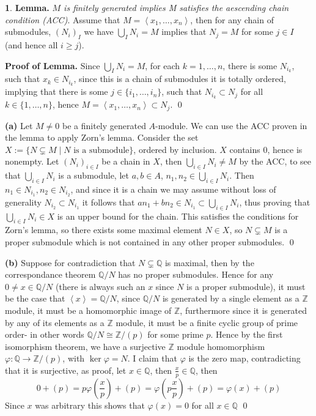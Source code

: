 \documentclass[11pt]{article}
\theoremstyle{definition}
\newtheorem{pb}{}
\newcommand{\set}[1]{\{#1\}}
\newcommand{\gen}[1]{\left\langle #1 \right\rangle}
\begin{document}
    \begin{pb}
        \textbf{Lemma.} \emph{\(M\) is finitely generated implies M satisfies the aescending chain condition (ACC)}. Assume that \(M = \gen{x_1,\hdots,x_n}\), then for any chain of submodules, \((N_i)_I\) we have \(\bigcup_I N_i = M\) implies that \(N_j = M\) for some \(j \in I\) (and hence all \(i \geq j\)).

        \textbf{Proof of Lemma.} Since \(\bigcup_I N_i = M\), for each \(k = 1,\hdots,n\), there is some \(N_{i_k}\), such that \(x_k \in N_{i_k}\), since this is a chain of submodules it is totally ordered, implying that there is some \(j \in \set{i_1,\hdots,i_n}\), such that \(N_{i_k} \subset N_j\) for all \(k \in \set{1,\hdots,n}\), hence \(M = \gen{x_1,\hdots,x_n} \subset N_j\). \qed

        \textbf{(a)}  Let \(M \neq 0\) be a finitely generated \(A\)-module. We can use the ACC proven in the lemma to apply Zorn's lemma. Consider the set \(X := \set{N \subsetneq M \mid N \text{ is a submodule}}\), ordered by inclusion. \(X\) contains \(0\), hence is nonempty. Let \((N_i)_{i\in I}\) be a chain in \(X\), then \(\bigcup_{i \in I}N_i \neq M\) by the ACC, to see that \(\bigcup_{i \in I}N_i\) is a submodule, let \(a,b \in A\), \(n_1, n_2 \in \bigcup_{i \in I}N_i\). Then \(n_1 \in N_{i_1}, n_2 \in N_{i_2}\), and since it is a chain we may assume without loss of generality \(N_{i_2} \subset N_{i_1}\) it follows that \(an_1 + bn_2 \in N_{i_1} \subset \bigcup_{i \in I}N_{i}\), thus proving that \(\bigcup_{i\in I}N_i \in X\) is an upper bound for the chain. This satisfies the conditions for Zorn's lemma, so there exists some maximal element \(N \in X\), so \(N \subsetneq M\) is a proper submodule which is not contained in any other proper submodules. \qed

        \textbf{(b)} Suppose for contradiction that \(N \subsetneq \mathbb{Q}\) is maximal, then by the correspondance theorem \(\mathbb{Q}/N\) has no proper submodules. Hence for any \(0 \neq x \in \mathbb{Q}/N\) (there is always such an \(x\) since \(N\) is a proper submodule), it must be the case that \(\gen{x} = \mathbb{Q}/N\), since \(\mathbb{Q}/N\) is generated by a single element as a \(\mathbb{Z}\) module, it must be a homomorphic image of \(\mathbb{Z}\), furthermore since it is generated by any of its elements as a \(\mathbb{Z}\) module, it must be a finite cyclic group of prime order- in other words \(\mathbb{Q}/N \cong \mathbb{Z}/(p)\) for some prime \(p\). Hence by the first isomorphism theorem, we have a surjective \(\mathbb{Z}\) module homomorphism \(\varphi: \mathbb{Q} \to \mathbb{Z}/(p)\), with \(\ker \varphi = N\). I claim that \(\varphi\) is the zero map, contradicting that it is surjective, as proof, let \(x \in \mathbb{Q}\), then \(\frac{x}{p} \in \mathbb{Q}\), then \[0 + (p) = p\varphi(\frac{x}{p}) + (p) = \varphi(p\frac{x}{p}) + (p) = \varphi(x) + (p)\]
        Since \(x\) was arbitrary this shows that \(\varphi(x) = 0\) for all \(x \in \mathbb{Q}\) \qed
    \end{pb}
\end{document}
